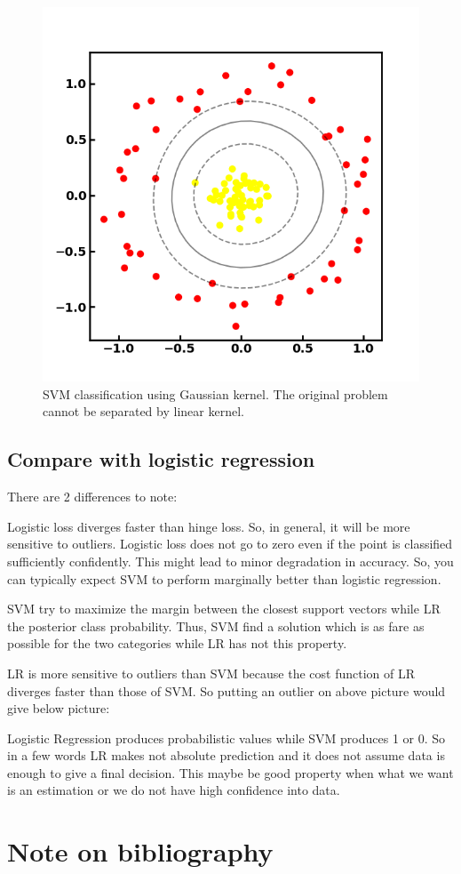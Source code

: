 \begin{refsection}
\begin{figure}[H]
	\centering
	\includegraphics[width=0.5\linewidth]{../figures/statisticalLearning/linearModelClassification/SVMKernelClassificationExample}
	\caption{SVM classification using Gaussian kernel. The original problem cannot be separated by linear kernel.}
	\label{fig:svmkernelclassificationexample}
\end{figure}




\subsection{Compare with logistic regression}


\begin{remark}
	There are 2 differences to note:
	
	Logistic loss diverges faster than hinge loss. So, in general, it will be more sensitive to outliers.
	Logistic loss does not go to zero even if the point is classified sufficiently confidently. This might lead to minor degradation in accuracy.
	So, you can typically expect SVM to perform marginally better than logistic regression.
	
	
	
	SVM try to maximize the margin between the closest support vectors while LR the posterior class probability. Thus, SVM find a solution which is as fare as possible for the two categories while LR has not this property.
	
	LR is more sensitive to outliers than SVM because the cost function of LR diverges faster than those of SVM. So putting an outlier on above picture would give below picture:
	
	Logistic Regression produces probabilistic values while SVM produces 1 or 0. So in a few words LR makes not absolute prediction and it does not assume data is enough to give a final decision. This maybe be good property when what we want is an estimation or we do not have high confidence into data.	
\end{remark}


\section{Note on bibliography}



\printbibliography
\end{refsection}

